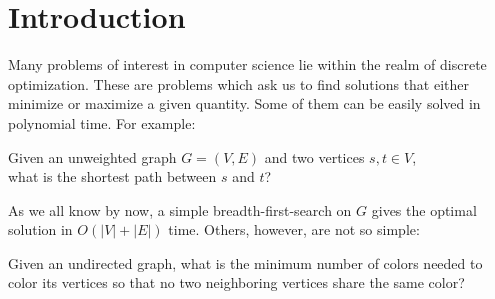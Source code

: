 \documentclass{article}
\newenvironment{envsection}[1]{\begin{trivlist}
\item[\hskip \labelsep {\bfseries #1}]}{\end{trivlist}}
\begin{document}
\newpage


\pagestyle{fancy}
\fancyhead{}
\fancyfoot{}
\fancyfoot[R]{\thepage}
\setcounter{page}{3}

\section{Introduction}

\noindent Many problems of interest in computer science lie within the realm of discrete optimization. These are problems which ask us to find solutions that either minimize or maximize a given quantity. Some of them can be easily solved in polynomial time. For example:
\begin{center}
    Given an unweighted graph $G = (V,E)$ and two vertices $s,t \in V$,\\
    what is the shortest path between $s$ and $t$?
\end{center}

\noindent As we all know by now, a simple breadth-first-search on $G$ gives the optimal solution in $O(|V| + |E|)$ time. Others, however, are not so simple:
\begin{center}
    Given an undirected graph, what is the minimum number of colors needed to\\ color its vertices so that no two neighboring vertices share the same color? 

\end{center}
\end{document}
